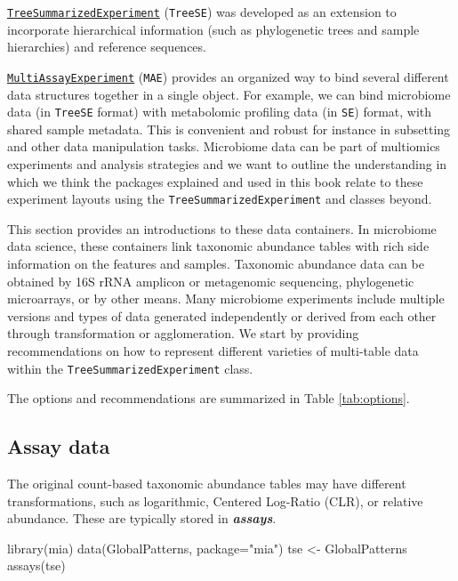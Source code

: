 \documentclass[
]{book}
\newenvironment{Shaded}{\begin{snugshade}}{\end{snugshade}}
\newcommand{\AttributeTok}[1]{\textcolor[rgb]{0.77,0.63,0.00}{#1}}
\newcommand{\FunctionTok}[1]{\textcolor[rgb]{0.00,0.00,0.00}{#1}}
\newcommand{\NormalTok}[1]{#1}
\newcommand{\OtherTok}[1]{\textcolor[rgb]{0.56,0.35,0.01}{#1}}
\newcommand{\StringTok}[1]{\textcolor[rgb]{0.31,0.60,0.02}{#1}}
\begin{document}
\href{https://www.bioconductor.org/packages/release/bioc/html/TreeSummarizedExperiment.html}{\texttt{TreeSummarizedExperiment}}
(\texttt{TreeSE}) was developed as an extension to incorporate hierarchical
information (such as phylogenetic trees and sample hierarchies) and
reference sequences.

\href{https://www.bioconductor.org/packages/release/bioc/html/MultiAssayExperiment.html}{\texttt{MultiAssayExperiment}}
(\texttt{MAE}) provides an organized way to bind several different data
structures together in a single object. For example, we can bind
microbiome data (in \texttt{TreeSE} format) with metabolomic profiling data
(in \texttt{SE}) format, with shared sample metadata. This is convenient and
robust for instance in subsetting and other data manipulation
tasks. Microbiome data can be part of multiomics experiments and
analysis strategies and we want to outline the understanding in which
we think the packages explained and used in this book relate to these
experiment layouts using the \texttt{TreeSummarizedExperiment} and classes
beyond.

This section provides an introductions to these data containers. In
microbiome data science, these containers link taxonomic abundance
tables with rich side information on the features and
samples. Taxonomic abundance data can be obtained by 16S rRNA amplicon
or metagenomic sequencing, phylogenetic microarrays, or by other
means. Many microbiome experiments include multiple versions and types
of data generated independently or derived from each other through
transformation or agglomeration. We start by providing recommendations
on how to represent different varieties of multi-table data within the
\texttt{TreeSummarizedExperiment} class.

The options and recommendations are summarized in Table \ref{tab:options}.

\hypertarget{assay-data}{%
\subsection{Assay data}\label{assay-data}}

The original count-based taxonomic abundance tables may have different
transformations, such as logarithmic, Centered Log-Ratio (CLR), or relative
abundance. These are typically stored in \emph{\textbf{assays}}.

\begin{Shaded}
\begin{Highlighting}[]
\FunctionTok{library}\NormalTok{(mia)}
\FunctionTok{data}\NormalTok{(GlobalPatterns, }\AttributeTok{package=}\StringTok{"mia"}\NormalTok{)}
\NormalTok{tse }\OtherTok{\textless{}{-}}\NormalTok{ GlobalPatterns}
\FunctionTok{assays}\NormalTok{(tse)}
\end{Highlighting}
\end{Shaded}
\end{document}
